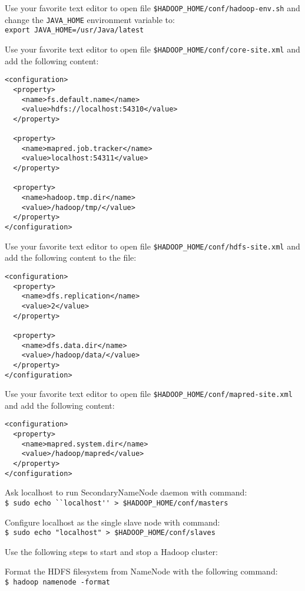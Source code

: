 Use your favorite text editor to open file \verb|$HADOOP_HOME/conf/hadoop-env.sh| and change the \verb|JAVA_HOME| environment variable to: \\
\verb|export JAVA_HOME=/usr/Java/latest|

Use your favorite text editor to open file \verb|$HADOOP_HOME/conf/core-site.xml| and add the following content:
\begin{verbatim}
<configuration>
  <property>
    <name>fs.default.name</name>
    <value>hdfs://localhost:54310</value>
  </property>

  <property>
    <name>mapred.job.tracker</name>
    <value>localhost:54311</value>
  </property>

  <property>
    <name>hadoop.tmp.dir</name>
    <value>/hadoop/tmp/</value>
  </property>
</configuration>
\end{verbatim}

Use your favorite text editor to open file \verb|$HADOOP_HOME/conf/hdfs-site.xml| and add the following content to the file:
\begin{verbatim}
<configuration>
  <property>
    <name>dfs.replication</name>
    <value>2</value>
  </property>

  <property>
    <name>dfs.data.dir</name>
    <value>/hadoop/data/</value>
  </property>
</configuration>
\end{verbatim}

Use your favorite text editor to open file \verb|$HADOOP_HOME/conf/mapred-site.xml| and add the following content:
\begin{verbatim}
<configuration>
  <property>
    <name>mapred.system.dir</name>
    <value>/hadoop/mapred</value>
  </property>
</configuration>
\end{verbatim}

Ask localhost to run SecondaryNameNode daemon with command: \\
\verb|$ sudo echo ``localhost'' > $HADOOP_HOME/conf/masters|

Configure localhost as the single slave node with command: \\
\verb|$ sudo echo "localhost" > $HADOOP_HOME/conf/slaves|

Use the following steps to start and stop a Hadoop cluster:

Format the HDFS filesystem from NameNode with the following command: \\
\verb|$ hadoop namenode -format|

